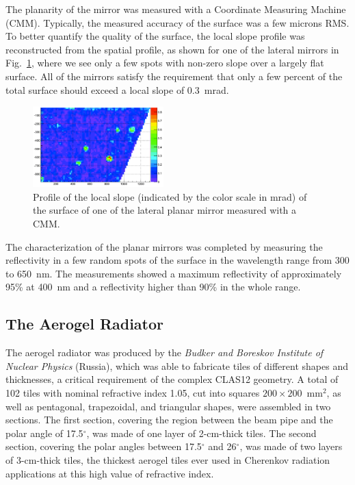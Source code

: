\documentclass[5p,times,twocolumn]{elsarticle}
\begin{document}
The planarity of the mirror was measured with a Coordinate Measuring Machine (CMM). Typically, the measured
accuracy of the surface was a few microns RMS. To better quantify the quality of the surface, the local slope profile
was reconstructed from the spatial profile, as shown for one of the lateral mirrors in Fig.~\ref{Fig:SlopeML}, where
we see only a few spots with non-zero slope over a largely flat surface. All of the mirrors satisfy the requirement that
only a few percent of the total surface should exceed a local slope of 0.3~mrad.

\begin{figure}
\begin{center}
\includegraphics[width=0.45\textwidth]{SlopeML.pdf}
\caption{Profile of the local slope (indicated by the color scale in mrad) of the surface of one of the lateral planar
  mirror measured with a CMM.}
\label{Fig:SlopeML}
\end{center}
\end{figure}

The characterization of the planar mirrors was completed by measuring the reflectivity in a few random spots of
the surface in the wavelength range from 300 to 650~nm. The measurements showed a maximum reflectivity of
approximately 95\% at 400~nm and a reflectivity higher than 90\% in the whole range.

\subsection{The Aerogel Radiator}

The aerogel radiator was produced by the {\it Budker and Boreskov Institute of Nuclear Physics} (Russia), which was
able to fabricate tiles of different shapes and thicknesses, a critical requirement of the complex CLAS12 geometry.
A total of 102 tiles with nominal refractive index 1.05, cut into squares $200 \times 200$~mm$^2$, as well as
pentagonal, trapezoidal, and triangular shapes, were assembled in two sections. The first section, covering the region
between the beam pipe and the polar angle of 17.5$^\circ$, was made of one layer of 2-cm-thick tiles. The second
section, covering the polar angles between 17.5$^\circ$ and 26$^\circ$, was made of two layers of 3-cm-thick tiles, the
thickest aerogel tiles ever used in Cherenkov radiation applications at this high value of refractive index.
\end{document}

